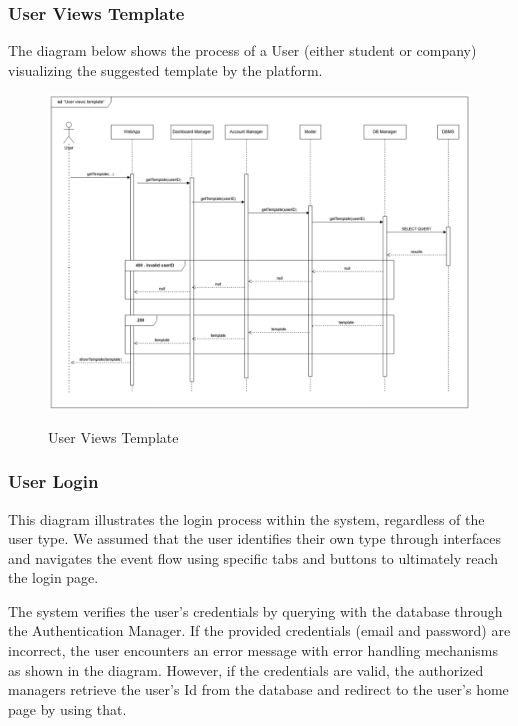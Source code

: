 \documentclass[a4paper,12pt]{article}
\begin{document}
\subsubsection*{User Views Template}
The diagram below shows the process of a User (either student or company) visualizing the suggested template by the platform.
\begin{figure}[H]
\centering
\includegraphics[scale = 0.5]{DD_figures/RuntimeView/UserViewsTemplateRV.png}\\
\caption{User Views Template}
\end{figure}
\newpage
\subsubsection*{ User Login}
    This diagram illustrates the login process within the system, regardless of the user type. We assumed that the user identifies their own type through interfaces and navigates the event flow using specific tabs and buttons to ultimately reach the login page. 
    
    The system verifies the user's credentials by querying with the database through the Authentication Manager. If the provided credentials (email and password) are incorrect, the user encounters an error message with error handling mechanisms  as shown in the diagram. However, if the credentials are valid, the authorized managers retrieve the user's Id from the database and redirect to the user's home page by using that.
    
\end{document}
